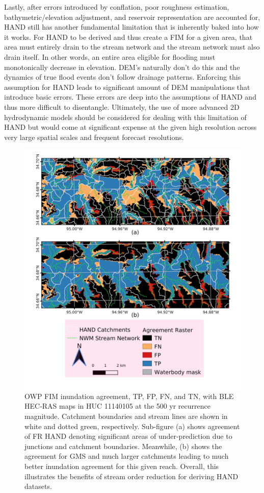 Lastly, after errors introduced by conflation, poor roughness estimation, bathymetric/elevation adjustment, and reservoir representation are accounted for, HAND still has another fundamental limitation that is inherently baked into how it works.
For HAND to be derived and thus create a FIM for a given area, that area must entirely drain to the stream network and the stream network must also drain itself.
In other words, an entire area eligible for flooding must monotonically decrease in elevation. 
DEM's naturally don't do this and the dynamics of true flood events don't follow drainage patterns.
Enforcing this assumption for HAND leads to significant amount of DEM manipulations that introduce basic errors.
These errors are deep into the assumptions of HAND and thus more difficult to disentangle.
Ultimately, the use of more advanced 2D hydrodynamic models should be considered for dealing with this limitation of HAND but would come at significant expense at the given high resolution across very large spatial scales and frequent forecast resolutions.
%
\begin{figure}[H]
\centering
\includegraphics[scale=1.0]{figures/gms_enhancement.jpg}
\caption{OWP FIM inundation agreement, TP, FP, FN, and TN, with BLE HEC-RAS maps in HUC 11140105 at the 500 yr recurrence magnitude.
Catchment boundaries and stream lines are shown in white and dotted green, respectively.
Sub-figure (a) shows agreement of FR HAND denoting significant areas of under-prediction due to junctions and catchment boundaries.
Meanwhile, (b) shows the agreement for GMS and much larger catchments leading to much better inundation agreement for this given reach. 
Overall, this illustrates the benefits of stream order reduction for deriving HAND datasets.
}
\label{fig:gms_enhancement}
\end{figure}
